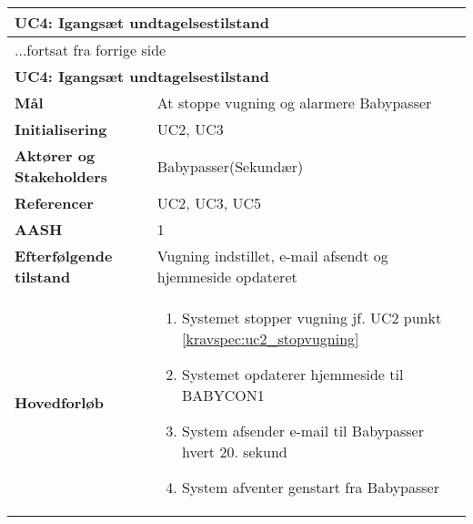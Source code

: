 \begin{center} \centering \label{kravspec:uc4}
	\begin{longtable}{|p{5cm}|p{9cm}|}  %
	\hline
		\multicolumn{2}{|l|}{\textbf{UC4: Igangsæt undtagelsestilstand}} \\\hline %
		\endfirsthead
		
		\multicolumn{2}{l}{...fortsat fra forrige side} \\ \hline %
		\multicolumn{2}{|l|}{\textbf{UC4: Igangsæt undtagelsestilstand}} \\\hline %
		\endhead	
		
		\textbf{Mål}							&At stoppe vugning og alarmere Babypasser		\\\hline
		\textbf{Initialisering}				&UC2, UC3		\\\hline
		\textbf{Aktører og Stakeholders}		&Babypasser(Sekundær)	\\\hline 
		\textbf{Referencer}					&UC2, UC3, UC5		\\\hline
		\textbf{AASH}						&1		\\\hline
		\textbf{Efterfølgende tilstand}		&Vugning indstillet, e-mail afsendt og hjemmeside opdateret 		\\\hline
		\textbf{Hovedforløb}					
			&\begin{enumerate}
				
				\item Systemet stopper vugning jf. UC2 punkt \ref{kravspec:uc2_stopvugning} 							
				
				\item \label{kravspec:uc4_opdaterweb}Systemet opdaterer hjemmeside til BABYCON1				
				\newline [Und: \ref{kravspec:uc4_opdaterweb}.a Ingen netværksforbindelse]
				
				\item \label{kravspec:uc4_emailafsend}System afsender e-mail til Babypasser hvert 20. sekund
				\newline [Und: \ref{kravspec:uc4_emailafsend}.a Ingen netværksforbindelse]
				
				\item System afventer genstart fra Babypasser
				

\end{enumerate}
\end{longtable}
\end{center}
